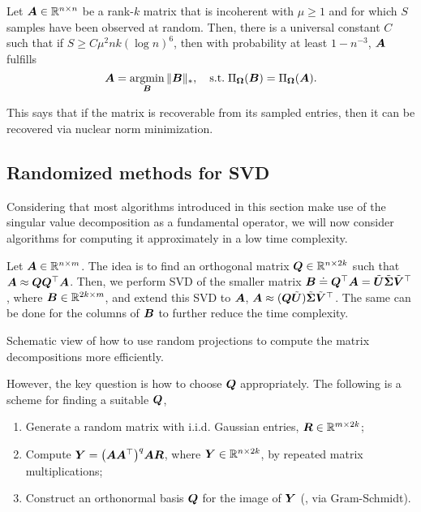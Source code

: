 \begin{theorem}
    Let $\bm{A} \in \mathbb{R}^{n \times n}$ be a rank-$k$ matrix that is incoherent with $\mu \geq 1$ and
    for which $S$ samples have been observed at random. Then, there is a universal constant $C$ such
    that if $S \geq C \mu^2 nk (\log n)^6$, then with probability at least $1 - n^{-3}$, $\bm{A}$
    fulfills \[
        \bm{A} = \operatorname*{argmin}_{\bm{B}} \| \bm{B} \|_*, \quad \mathrm{s.t.}\; \Pi_{\bm{\Omega}}(\bm{B}) = \Pi_{\bm{\Omega}}(\bm{A}).
    \]
\end{theorem}

This says that if the matrix is recoverable from its sampled entries, then it can be recovered via
nuclear norm minimization.

\subsection{Randomized methods for SVD}

Considering that most algorithms introduced in this section make use of the singular value
decomposition as a fundamental operator, we will now consider algorithms for computing it
approximately in a low time complexity.

Let $\bm{A} \in \mathbb{R}^{n \times m}$. The idea is to find an orthogonal matrix $\bm{Q} \in \mathbb{R}^{n
        \times 2k}$ such that $\bm{A} \approx \bm{Q} \bm{Q}^\top \bm{A}$. Then, we perform SVD
of the smaller matrix $\bm{B} \doteq \bm{Q}^\top \bm{A} = \tilde{\bm{U}}
    \tilde{\bm{\Sigma}} \tilde{\bm{V}}^\top$, where $\bm{B} \in \mathbb{R}^{2k\times m}$, and extend
this SVD to $\bm{A}$, $\bm{A} \approx (\bm{Q} \tilde{\bm{U}}) \tilde{\bm{\Sigma}}
    \tilde{\bm{V}}^\top$. The same can be done for the columns of $\bm{B}$ to further reduce
the time complexity.

\begin{marginfigure}
    \centering
    \caption{Schematic view of how to use random projections to compute the matrix decompositions more efficiently.}
    \label{fig:random-svd}
\end{marginfigure}

However, the key question is how to choose $\bm{Q}$ appropriately. The following is a scheme for
finding a suitable $\bm{Q}$,
\begin{enumerate}
    \item Generate a random matrix with i.i.d. Gaussian entries, $\bm{R} \in \mathbb{R}^{m \times 2k}$;
    \item Compute $\mat{Y} = \lft( \mat{A}\transpose{\mat{A}} \rgt)^q \mat{A} \mat{R}$, where $\bm{Y} \in
              \mathbb{R}^{n \times 2k}$, by repeated matrix multiplications;
    \item Construct an orthonormal basis $\bm{Q}$ for the image of $\bm{Y}$ (\eg, via Gram-Schmidt).
\end{enumerate}
